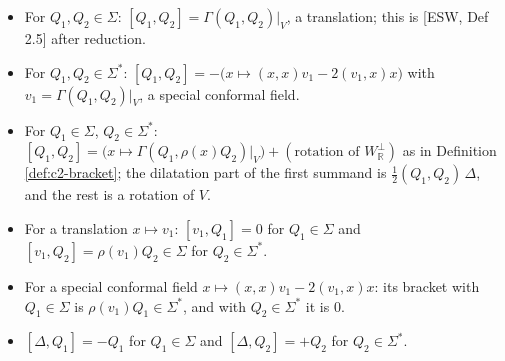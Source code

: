 \begin{proposition}
\label{prop:c2-special}
\begin{itemize}
\item For $Q_1,Q_2\in\Sigma$: $[Q_1,Q_2]=\Gamma(Q_1,Q_2)|_V$, a translation; this is [ESW, Def 2.5] after reduction.
\item For $Q_1,Q_2\in\Sigma^*$: $[Q_1,Q_2]=-\big(x\mapsto(x,x)v_1-2(v_1,x)x\big)$ with $v_1=\Gamma(Q_1,Q_2)|_V$, a special conformal field.
\item For $Q_1\in\Sigma$, $Q_2\in\Sigma^*$: $[Q_1,Q_2]=\big(x\mapsto\Gamma(Q_1,\rho(x)Q_2)|_V\big)+(\text{rotation of }W_{\mathbb R}^\perp)$ as in Definition \ref{def:c2-bracket}; the dilatation part of the first summand is $\tfrac12(Q_1,Q_2)\,\Delta$, and the rest is a rotation of $V$.
\item For a translation $x\mapsto v_1$: $[v_1,Q_1]=0$ for $Q_1\in\Sigma$ and $[v_1,Q_2]=\rho(v_1)Q_2\in\Sigma$ for $Q_2\in\Sigma^*$.
\item For a special conformal field $x\mapsto(x,x)v_1-2(v_1,x)x$: its bracket with $Q_1\in\Sigma$ is $\rho(v_1)Q_1\in\Sigma^*$, and with $Q_2\in\Sigma^*$ it is $0$.
\item $[\Delta,Q_1]=-Q_1$ for $Q_1\in\Sigma$ and $[\Delta,Q_2]=+Q_2$ for $Q_2\in\Sigma^*$.
\end{itemize}
\end{proposition}


